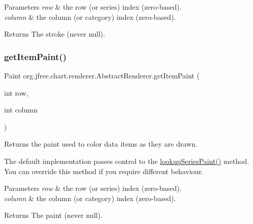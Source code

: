 \begin{DoxyParams}{Parameters}
{\em row} & the row (or series) index (zero-\/based). \\
\hline
{\em column} & the column (or category) index (zero-\/based).\\
\hline
\end{DoxyParams}
\begin{DoxyReturn}{Returns}
The stroke (never {\ttfamily null}). 
\end{DoxyReturn}
\mbox{\label{classorg_1_1jfree_1_1chart_1_1renderer_1_1_abstract_renderer_ae458c0995fdd78cfa69d4a09c63ff036}} 
\subsubsection{\texorpdfstring{get\+Item\+Paint()}{getItemPaint()}}
{\footnotesize\ttfamily Paint org.\+jfree.\+chart.\+renderer.\+Abstract\+Renderer.\+get\+Item\+Paint (\begin{DoxyParamCaption}\item[{int}]{row,  }\item[{int}]{column }\end{DoxyParamCaption})}

Returns the paint used to color data items as they are drawn. 

The default implementation passes control to the {\ttfamily \mbox{\hyperlink{classorg_1_1jfree_1_1chart_1_1renderer_1_1_abstract_renderer_abc231547c7d2059d6158ac21bb5826cf}{lookup\+Series\+Paint()}}} method. You can override this method if you require different behaviour.


\begin{DoxyParams}{Parameters}
{\em row} & the row (or series) index (zero-\/based). \\
\hline
{\em column} & the column (or category) index (zero-\/based).\\
\hline
\end{DoxyParams}
\begin{DoxyReturn}{Returns}
The paint (never {\ttfamily null}). 
\end{DoxyReturn}
\mbox{\label{classorg_1_1jfree_1_1chart_1_1renderer_1_1_abstract_renderer_abc70953b32cbf7ddc8f37f7747e66d8c}} 
